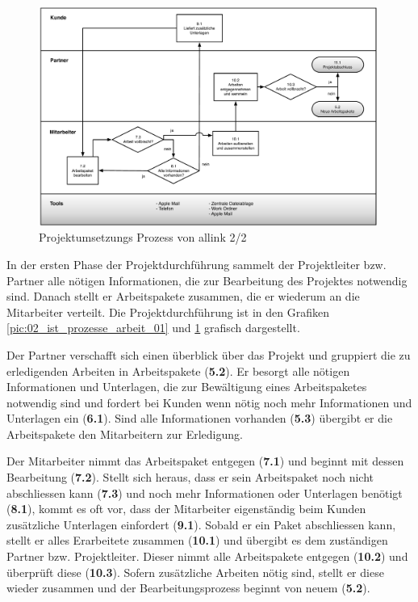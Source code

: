 \begin{figure}[p]
\begin{center}
\includegraphics[width=0.99\textwidth,angle=0]{./bilder/analyse/02_ist_prozesse_arbeit_02.pdf}
\caption[Projektumsetzungs Prozess von allink 2/2]{Projektumsetzungs 
    Prozess von allink 2/2\footnotemark}
\label{pic:02_ist_prozesse_arbeit_02}
\end{center}
\end{figure}

In der ersten Phase der Projektdurchführung sammelt der Projektleiter bzw.
Partner alle nötigen Informationen, die zur Bearbeitung des Projektes notwendig sind.
Danach stellt er Arbeitspakete zusammen, die er wiederum an die Mitarbeiter verteilt.
Die Projektdurchführung ist in den Grafiken \ref{pic:02_ist_prozesse_arbeit_01} und 
\ref{pic:02_ist_prozesse_arbeit_02} grafisch dargestellt.

Der Partner verschafft sich einen überblick über das Projekt und gruppiert
die zu erledigenden Arbeiten in Arbeitspakete (\textbf{5.2}). Er besorgt alle nötigen Informationen
und Unterlagen, die zur Bewältigung eines Arbeitspaketes notwendig sind und fordert
bei Kunden wenn nötig noch mehr Informationen und Unterlagen ein (\textbf{6.1}).
Sind alle Informationen vorhanden (\textbf{5.3}) übergibt er die Arbeitspakete
den Mitarbeitern zur Erledigung.

Der Mitarbeiter nimmt das Arbeitspaket entgegen (\textbf{7.1}) und beginnt
mit dessen Bearbeitung (\textbf{7.2}). Stellt sich heraus, dass er sein Arbeitspaket
noch nicht abschliessen kann (\textbf{7.3}) und noch mehr Informationen oder
Unterlagen benötigt (\textbf{8.1}), kommt es oft vor, dass der Mitarbeiter
eigenständig beim Kunden zusätzliche Unterlagen einfordert (\textbf{9.1}).
Sobald er ein Paket abschliessen kann, stellt er alles Erarbeitete zusammen (\textbf{10.1})
und übergibt es dem zuständigen Partner bzw. Projektleiter.
Dieser nimmt alle Arbeitspakete entgegen (\textbf{10.2})
und überprüft diese (\textbf{10.3}). Sofern zusätzliche Arbeiten nötig sind,
stellt er diese wieder zusammen und der Bearbeitungsprozess beginnt von neuem (\textbf{5.2}).

